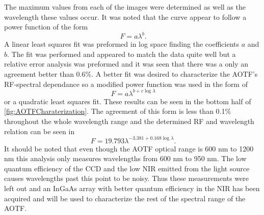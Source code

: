 
The maximum values from each of the images were determined as well as the wavelength these values occur. It was noted that the curve appear to follow a power function of the form
\begin{equation}
    \ F = a\lambda^{b}.
    \label{eqn:powerFunction}
\end{equation}
A linear least squares fit was preformed in log space finding the coefficients $a$ and $b$. The fit was performed and appeared to match the data quite well but a relative error analysis was preformed and it was seen that there was a only an agreement better than 0.6\%. A better fit was desired to characterize the AOTF's RF-spectral dependance so a modified power function was used in the form of
 \begin{equation}
    \ F = a\lambda^{b+c\log\lambda}
    \label{eqn:modifiedPowerFunction}
\end{equation}
or a quadratic least squares fit. These results can be seen in the bottom half of \autoref{fig:AOTFCharaterization}. The agreement of this form is less than 0.1\% throughout the whole wavelength range and the determined RF and wavelength relation can be seen in
\begin{equation}
    \ F = 19.793\lambda^{-3.381+0.168\log\lambda}.
    \label{eqn:modifiedPowerFunctionCoeffiecicents}
\end{equation}
 It should be noted that even though the AOTF optical range is 600 nm to 1200 nm this analysis only measures wavelengths from 600 nm to 950 nm. The low quantum efficiency of the CCD and the low NIR emitted from the light source causes wavelengths past this point to be noisy. Thus these measurements were left out and an InGaAs array with better quantum efficiency in the NIR has been acquired and will be used to characterize the rest of the spectral range of the AOTF.

